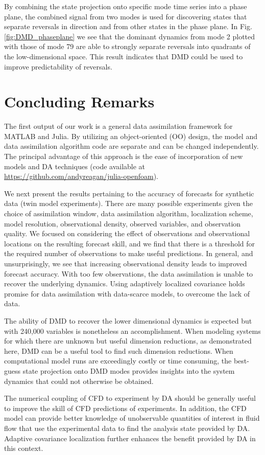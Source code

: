 By combining the state projection onto specific mode time series into a phase plane, the combined signal from two modes is used for discovering states that separate reversals in direction and from other states in the phase plane.
In Fig. \ref{fig:DMD_phaseplane} we see that the dominant dynamics from mode 2 plotted with those of mode 79 are able to strongly separate reversals into quadrants of the low-dimensional space.
This result indicates that DMD could be used to improve predictability of reversals.

\section{Concluding Remarks}

The first output of our work is a general data assimilation framework for MATLAB and Julia.
By utilizing an object-oriented (OO) design, the model and data assimilation algorithm code are separate and can be changed independently.
The principal advantage of this approach is the ease of incorporation of new models and DA techniques (code available at \url{https://github.com/andyreagan/julia-openfoam}).

We next present the results pertaining to the accuracy of forecasts for synthetic data (twin model experiments).
There are many possible experiments given the choice of assimilation window, data assimilation algorithm, localization scheme, model resolution, observational density, observed variables, and observation quality.
We focused on considering the effect of observations and observational locations on the resulting forecast skill, and we find that there is a threshold for the required number of observations to make useful predictions.
In general, and unsurprisingly, we see that increasing observational density leads to improved forecast accuracy.
With too few observations, the data assimilation is unable to recover the underlying dynamics.
Using adaptively localized covariance holds promise for data assimilation with data-scarce models, to overcome the lack of data.

The ability of DMD to recover the lower dimensional dynamics is expected but with 240,000 variables is nonetheless an accomplishment.
When modeling systems for which there are unknown but useful dimension reductions, as demonstrated here, DMD can be a useful tool to find such dimension reductions.
When computational model runs are exceedingly costly or time consuming, the best-guess state projection onto DMD modes provides insights into the system dynamics that could not otherwise be obtained.

The numerical coupling of CFD to experiment by DA should be generally useful to improve the skill of CFD predictions of experiments.
In addition, the CFD model can provide better knowledge of unobservable quantities of interest in fluid flow that use the experimental data to find the analysis state provided by DA.
Adaptive covariance localization further enhances the benefit provided by DA in this context.

